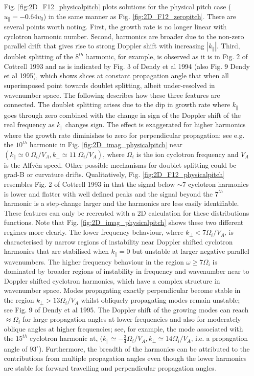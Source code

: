 \documentclass[12pt]{iopart}
\begin{document}
Fig. \ref{fig:2D_F12_physicalpitch} plots solutions for the physical pitch case ($u_\parallel = -0.64 v_0$) in the same manner as Fig. \ref{fig:2D_F12_zeropitch}. There are several points worth noting. First, the growth rate is no longer linear with cyclotron harmonic number. Second, harmonics are broader due to the non-zero parallel drift that gives rise to strong Doppler shift with increasing $|k_\parallel|$. Third, doublet splitting of the $8^{th}$ harmonic, for example, is observed as it is in Fig. 2 of Cottrell 1993 and as is indicated by Fig. 3 of Dendy et al 1994 (also Fig. 9 Dendy et al 1995), which shows slices at constant propagation angle that when all superimposed point towards doublet splitting, albeit under-resolved in wavenumber space. The following describes how these three features are connected. The doublet splitting arises due to the dip in growth rate where $k_\parallel$ goes through zero combined with the change in sign of the Doppler shift of the real frequency as $k_\parallel$ changes sign. The effect is exaggerated for higher harmonics where the growth rate diminishes to zero for perpendicular propagation; see e.g. the $10^{th}$ harmonic in Fig. \ref{fig:2D_imag_physicalpitch} near $(k_\parallel \simeq 0\; \Omega_{i}/V_A, k_\bot \simeq 11\; \Omega_{i}/V_A)$, where $\Omega_{i}$ is the ion cyclotron frequency and $V_A$ is the Alfv{\'e}n speed. Other possible mechanisms for doublet splitting could be grad-B or curvature drifts\cite{Cottrell1993}. Qualitatively, Fig. \ref{fig:2D_F12_physicalpitch} resembles Fig. 2 of Cottrell 1993 in that the signal below $\sim 7$ cyclotron harmonics is lower and flatter with well defined peaks and the signal beyond the $7^{th}$ harmonic is a step-change larger and the harmonics are less easily identifiable. These features can only be recreated with a 2D calculation for these distributions functions. Note that Fig. \ref{fig:2D_imag_physicalpitch} shows these two different regimes more clearly. The lower frequency behaviour, where $k_\perp < 7 \Omega_i/V_A$, is characterised by narrow regions of instability near Doppler shifted cyclotron harmonics that are stabilised when $k_\parallel=0$ but unstable at larger negative parallel wavenumbers. The higher frequency behaviour in the region $\omega\geq 7\Omega_i$ is dominated by broader regions of instability in frequency and wavenumber near to Doppler shifted cyclotron harmonics, which have a complex structure in wavenumber space. Modes propagating exactly perpendicular become stable in the region $k_\perp > 13 \Omega_i/V_A$ whilst obliquely propagating modes remain unstable; see Fig. 9 of Dendy et al 1995. The Doppler shift of the growing modes can reach $\approx \Omega_i$ for large propagation angles at lower frequencies and also for moderately oblique angles at higher frequencies; see, for example, the mode associated with the $15^{th}$ cyclotron harmonic at, $(k_\parallel \simeq -\frac{3}{4} \Omega_i/V_A, k_\perp \simeq 14 \Omega_i/V_A$, i.e. a propagation angle of $93^\circ$). Furthermore, the breadth of the harmonics can be attributed to the contributions from multiple propagation angles even though the lower harmonics are stable for forward travelling and perpendicular propagation angles.
\end{document}
